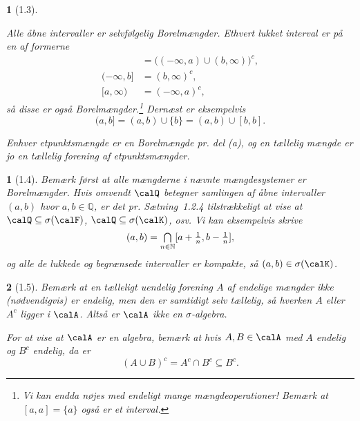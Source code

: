 \documentclass[a4paper, 11pt, article, danish, oneside]{memoir}
\title{\doctitle}
\author{\docauthor}
\newcommand{\naturals}{\mathbb{N}}
\newcommand{\rationals}{\mathbb{Q}}
\newcommand*\union\cup
\newcommand*\intersect\cap
\DeclareMathOperator*{\smallbigcap}{\textstyle\bigcap}
\DeclareMathOperator*{\bigintersect}{\mathchoice
    {\smallbigcap}%
    {\bigcap}%
    {\bigcap}%
    {\bigcap}%
}
\newcommand{\pencilsymbol}{\raisebox{-2pt}{\normalfont\PencilLeft}}
\theoremstyle{changedotcustomnumber}
\newtheorem{opgave}{\pencilsymbol}
\theoremstyle{changedotbreakcustomnumber}
\newtheorem{opgavebreak}{\pencilsymbol}
\begin{document}
\maketitle

\begin{opgavebreak}[1.3]
\begin{solutionsec}
    \item Alle åbne intervaller er selvfølgelig Borelmængder. Ethvert lukket interval er på en af formerne
    \begin{align*}
        [a,b]
            &= \bigl( (-\infty,a) \union (b,\infty) \bigr)^c, \\
        (-\infty,b]
            &= (b,\infty)^c, \\
        [a,\infty)
            &= (-\infty,a)^c,
    \end{align*}
    så disse er også Borelmængder.\footnote{Vi kan endda nøjes med endeligt mange mængdeoperationer! Bemærk at $[a,a] = \{a\}$ også er et interval.} Dernæst er eksempelvis
    \begin{equation*}
        (a,b]
            = (a,b) \union \{b\}
            = (a,b) \union [b,b].
    \end{equation*}

    \item Enhver etpunktsmængde er en Borelmængde pr. del (a), og en tællelig mængde er jo en tællelig forening af etpunktsmængder.
\end{solutionsec}
\end{opgavebreak}

\begin{opgave}[1.4]
    Bemærk først at alle mængderne i nævnte mængdesystemer er Borelmængder. Hvis omvendt $\calQ$ betegner samlingen af åbne intervaller $(a,b)$ hvor $a,b \in \rationals$, er det pr. Sætning~1.2.4 tilstrækkeligt at vise at $\calQ \subseteq \sigma(\calF)$, $\calQ \subseteq \sigma(\calK)$, osv. Vi kan eksempelvis skrive
    \begin{equation*}
        (a,b)
            = \bigintersect_{n\in\naturals} [a+\tfrac{1}{n},b-\tfrac{1}{n}],
    \end{equation*}
    og alle de lukkede og begrænsede intervaller er kompakte, så $(a,b) \in \sigma(\calK)$.
\end{opgave}

\begin{opgave}[1.5]
    Bemærk at en tælleligt uendelig forening $A$ af endelige mængder ikke (nødvendigvis) er endelig, men den er samtidigt selv tællelig, så hverken $A$ eller $A^c$ ligger i $\calA$. Altså er $\calA$ ikke en $\sigma$-algebra.

    For at vise at $\calA$ er en algebra, bemærk at hvis $A,B \in \calA$ med $A$ endelig og $B^c$ endelig, da er
    \begin{equation*}
        (A \union B)^c
            = A^c \intersect B^c
            \subseteq B^c.
    \end{equation*}
\end{opgave}
\end{document}
